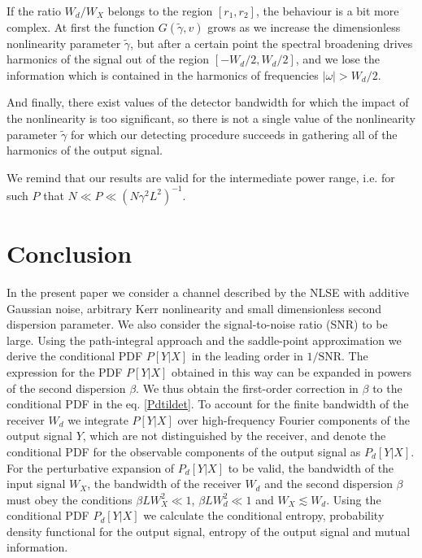 \documentclass{article}
\begin{document}
If the ratio $W_{d}/W_{X}$ belongs to the region $[r_{1},r_{2}]$, the behaviour is a bit more complex. At first the function $G(\tilde{\gamma}, v)$ grows as we increase the dimensionless nonlinearity parameter $\tilde{\gamma}$, but after a certain point the spectral broadening drives harmonics of the signal out of the region $[-W_{d}/2,W_{d}/2]$, and we lose the information which is contained in the harmonics of frequencies $|\omega|>W_{d}/2$.

And finally, there exist values of the detector bandwidth for which the impact of the nonlinearity is too significant, so there is not a single value of the nonlinearity parameter $\tilde{\gamma}$ for which our detecting procedure succeeds in gathering all of the harmonics of the output signal.

We remind that our results are valid for the intermediate power range, i.e. for such $P$ that $N \ll P \ll (N\gamma^{2}L^{2})^{-1}$.



\section{Conclusion}

In the present paper we consider a channel described by the NLSE with additive Gaussian noise, arbitrary Kerr nonlinearity and small dimensionless second dispersion parameter. We also consider the signal-to-noise ratio (SNR) to be large. Using the path-integral approach and the saddle-point approximation we derive the conditional PDF $P[Y|X]$ in the leading order in $1/\textrm{SNR}$. The expression for the PDF $P[Y|X]$ obtained in this way can be expanded in powers of the second dispersion $\beta$. We thus obtain the first-order correction in $\beta$ to the conditional PDF in the eq. \eqref{Pdtildet}. To account for the finite bandwidth of the receiver $W_{d}$ we integrate $P[Y|X]$ over high-frequency Fourier components of the output signal $Y$, which are not distinguished by the receiver, and denote the conditional PDF for the observable components of the output signal as $P_{d}[Y|X]$. For the perturbative expansion of $P_{d}[Y|X]$ to be valid, the bandwidth of the input signal $W_{X}$, the bandwidth of the receiver $W_{d}$ and the second dispersion $\beta$ must obey the conditions $\beta L W_{X}^{2} \ll 1$, $\beta L W_{d}^{2} \ll 1$ and $W_{X} \lesssim W_{d}$. Using the conditional PDF $P_{d}[Y|X]$ we calculate the conditional entropy, probability density functional for the output signal, entropy of the output signal and mutual information. 
\end{document}
